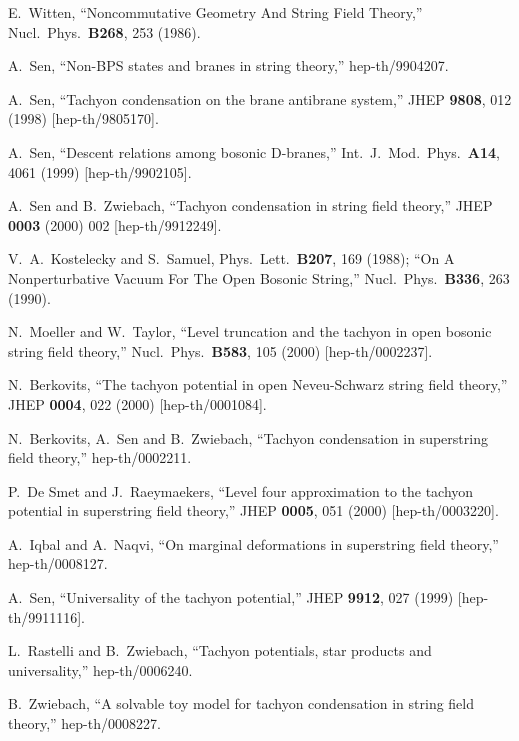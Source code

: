 \documentclass[a4paper,12pt]{article}
\begin{document}
\begin{thebibliography}{99}

E.~Witten,
``Noncommutative Geometry And String Field Theory,''
Nucl.\ Phys.\  {\bf B268}, 253 (1986).

A.~Sen,
``Non-BPS states and branes in string theory,''
hep-th/9904207.

A.~Sen,
``Tachyon condensation on the brane antibrane system,''
JHEP {\bf 9808}, 012 (1998)
[hep-th/9805170].

A.~Sen,
``Descent relations among bosonic D-branes,''
Int.\ J.\ Mod.\ Phys.\  {\bf A14}, 4061 (1999)
[hep-th/9902105].

A.~Sen and B.~Zwiebach,
``Tachyon condensation in string field theory,''
JHEP {\bf 0003} (2000) 002
[hep-th/9912249].

V.~A.~Kostelecky and S.~Samuel,
%
Phys.\ Lett.\  {\bf B207}, 169 (1988);
``On A Nonperturbative Vacuum For The Open Bosonic String,''
Nucl.\ Phys.\  {\bf B336}, 263 (1990).

N.~Moeller and W.~Taylor,
``Level truncation and the tachyon in open bosonic string field
theory,''
Nucl.\ Phys.\  {\bf B583}, 105 (2000)
[hep-th/0002237].

N.~Berkovits,
``The tachyon potential in open Neveu-Schwarz string field theory,''
JHEP {\bf 0004}, 022 (2000)
[hep-th/0001084].

N.~Berkovits, A.~Sen and B.~Zwiebach,
``Tachyon condensation in superstring field theory,''
hep-th/0002211.

P.~De Smet and J.~Raeymaekers,
``Level four approximation to the tachyon potential in superstring
field  theory,''
JHEP {\bf 0005}, 051 (2000)
[hep-th/0003220].

A.~Iqbal and A.~Naqvi,
``On marginal deformations in superstring field theory,''
hep-th/0008127.

A.~Sen,
``Universality of the tachyon potential,''
JHEP {\bf 9912}, 027 (1999)
[hep-th/9911116].

L.~Rastelli and B.~Zwiebach,
``Tachyon potentials, star products and universality,''
hep-th/0006240.

B.~Zwiebach,
``A solvable toy model for tachyon condensation in string field
theory,''
hep-th/0008227.


\end{thebibliography}
\end{document}
